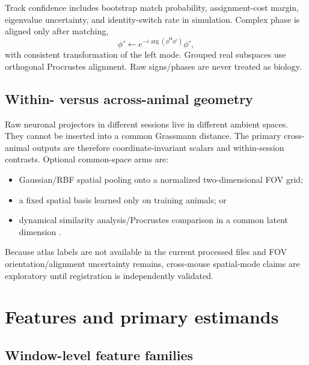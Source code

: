 \documentclass[11pt,a4paper]{article}
\newcommand{\Hh}{^{\mathsf H}}
\begin{document}
Track confidence includes bootstrap match probability, assignment-cost margin, eigenvalue uncertainty, and identity-switch rate in simulation. Complex phase is aligned only after matching,
\begin{equation}
  \phi'\leftarrow e^{-i\arg(\phi\Hh\phi')}\phi',
\end{equation}
with consistent transformation of the left mode. Grouped real subspaces use orthogonal Procrustes alignment. Raw signs/phases are never treated as biology.

\subsection{Within- versus across-animal geometry}

Raw neuronal projectors in different sessions live in different ambient spaces. They cannot be inserted into a common Grassmann distance. The primary cross-animal outputs are therefore coordinate-invariant scalars and within-session contrasts. Optional common-space arms are:

\begin{itemize}
  \item Gaussian/RBF spatial pooling onto a normalized two-dimensional FOV grid;
  \item a fixed spatial basis learned only on training animals; or
  \item dynamical similarity analysis/Procrustes comparison in a common latent dimension \citep{ostrow2023}.
\end{itemize}

Because atlas labels are not available in the current processed files and FOV orientation/alignment uncertainty remains, cross-mouse spatial-mode claims are exploratory until registration is independently validated.

\section{Features and primary estimands}

\subsection{Window-level feature families}
\end{document}
